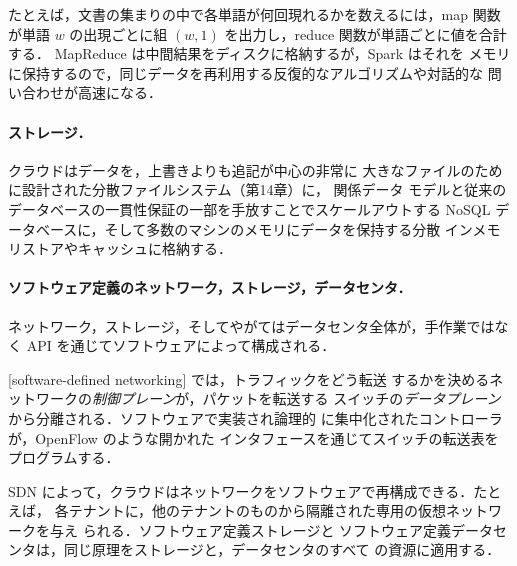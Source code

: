 \documentclass[../main.tex]{subfiles}
\begin{document}
たとえば，文書の集まりの中で各単語が何回現れるかを数えるには，map 関数が単語
$w$ の出現ごとに組 $(w, 1)$ を出力し，reduce 関数が単語ごとに値を合計する．
MapReduce は中間結果をディスクに格納するが，Spark \cite{zaharia2012} はそれを
メモリに保持するので，同じデータを再利用する反復的なアルゴリズムや対話的な
問い合わせが高速になる．

\paragraph{ストレージ．}クラウドはデータを，上書きよりも追記が中心の非常に
大きなファイルのために設計された分散ファイルシステム（第14章）に，%
関係データ
モデルと従来のデータベースの一貫性保証の一部を手放すことでスケールアウトする
NoSQL データベースに，そして多数のマシンのメモリにデータを保持する分散
インメモリストアやキャッシュに格納する．

\paragraph{ソフトウェア定義のネットワーク，ストレージ，データセンタ．}
ネットワーク，ストレージ，そしてやがてはデータセンタ全体が，手作業ではなく
API を通じてソフトウェアによって構成される．

\begin{definition}[ソフトウェア定義ネットワーキング]
  [software-defined networking]%
  では，トラフィックをどう転送
  するかを決めるネットワークの\emph{制御プレーン}が，パケットを転送する
  スイッチの\emph{データプレーン}から分離される．ソフトウェアで実装され論理的
  に集中化されたコントローラが，OpenFlow \cite{mckeown2008} のような開かれた
  インタフェースを通じてスイッチの転送表をプログラムする．
\end{definition}

SDN によって，クラウドはネットワークをソフトウェアで再構成できる．たとえば，
各テナントに，他のテナントのものから隔離された専用の仮想ネットワークを与え
られる．ソフトウェア定義ストレージと
ソフトウェア定義データセンタは，同じ原理をストレージと，データセンタのすべて
の資源に適用する．
\end{document}
